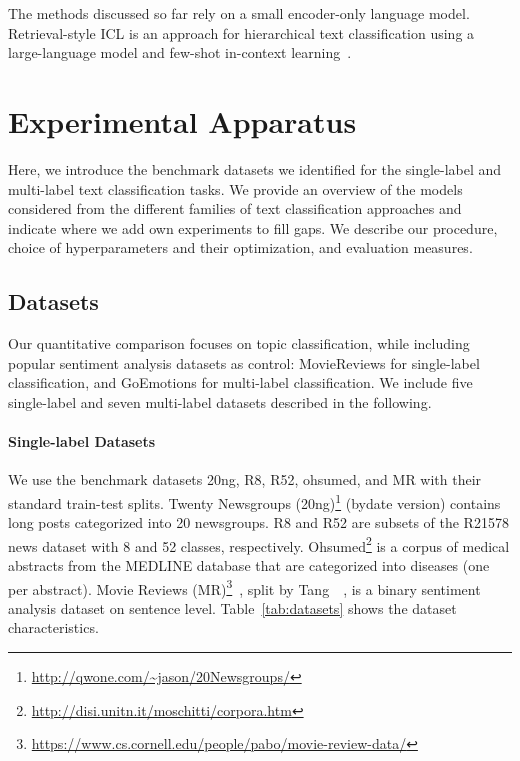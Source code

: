 The methods discussed so far rely on a small encoder-only language model.
Retrieval-style ICL is an approach for hierarchical text classification using a large-language model and few-shot in-context learning~\cite{DBLP:journals/corr/abs-2406-17534}.

\section{Experimental Apparatus}\label{sec:apparatus}

Here, we introduce the benchmark datasets we identified for the single-label and multi-label text classification tasks.
We provide an overview of the models considered from the different families of text classification approaches and indicate where we add own experiments to fill gaps.
We describe our procedure, choice of hyperparameters and their optimization, and evaluation measures.

\subsection{Datasets}\label{sec:datasets}

Our quantitative comparison focuses on topic classification, while including popular sentiment analysis datasets as control: MovieReviews for single-label classification, and GoEmotions for multi-label classification.
We include five single-label and seven multi-label datasets described in the following.

\paragraph{Single-label Datasets} 
We use the benchmark datasets 20ng, R8, R52, ohsumed, and MR with their standard train-test splits.
Twenty Newsgroups (20ng)\footnote{\url{http://qwone.com/~jason/20Newsgroups/}} (bydate version) contains long posts categorized into 20 newsgroups.
R8 and R52 are subsets of the R21578 news dataset with 8 and 52 classes, respectively.  
Ohsumed\footnote{\url{http://disi.unitn.it/moschitti/corpora.htm}} is a corpus of medical abstracts from the MEDLINE database that are categorized into diseases (one per abstract). 
Movie Reviews (MR)\footnote{\url{https://www.cs.cornell.edu/people/pabo/movie-review-data/}}~\cite{pang-lee-2005-seeing}, split by Tang~\etal~\cite{DBLP:conf/kdd/TangQM15}, is a binary sentiment analysis dataset on sentence level. 
Table~\ref{tab:datasets} shows the dataset characteristics. 

